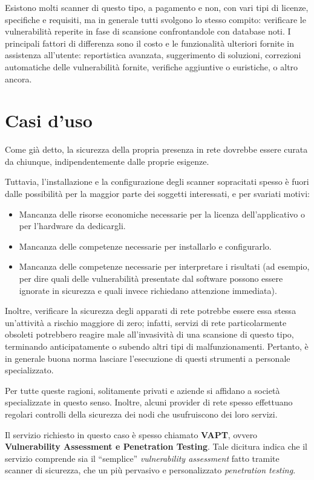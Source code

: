 Esistono molti scanner di questo tipo, a pagamento e non, con vari tipi di licenze, specifiche e requisiti, ma in generale tutti svolgono lo stesso compito: verificare le vulnerabilità reperite in fase di scansione confrontandole con database noti. I principali fattori di differenza sono il costo e le funzionalità ulteriori fornite in assistenza all'utente: reportistica avanzata, suggerimento di soluzioni, correzioni automatiche delle vulnerabilità fornite, verifiche aggiuntive o euristiche, o altro ancora.

\section{Casi d'uso}
Come già detto, la sicurezza della propria presenza in rete dovrebbe essere curata da chiunque, indipendentemente dalle proprie esigenze.

Tuttavia, l'installazione e la configurazione degli scanner sopracitati spesso è fuori dalle possibilità per la maggior parte dei soggetti interessati, e per svariati motivi:
\begin{itemize}
    \item Mancanza delle risorse economiche necessarie per la licenza dell'applicativo o per l'hardware da dedicargli.
    \item Mancanza delle competenze necessarie per installarlo e configurarlo.
    \item Mancanza delle competenze necessarie per interpretare i risultati (ad esempio, per dire quali delle vulnerabilità presentate dal software possono essere ignorate in sicurezza e quali invece richiedano attenzione immediata).
\end{itemize}

Inoltre, verificare la sicurezza degli apparati di rete potrebbe essere essa stessa un'attività a rischio maggiore di zero; infatti, servizi di rete particolarmente obsoleti potrebbero reagire male all'invasività di una scansione di questo tipo, terminando anticipatamente o subendo altri tipi di malfunzionamenti. Pertanto, è in generale buona norma lasciare l'esecuzione di questi strumenti a personale specializzato.

Per tutte queste ragioni, solitamente privati e aziende si affidano a società specializzate in questo senso. Inoltre, alcuni provider di rete spesso effettuano regolari controlli della sicurezza dei nodi che usufruiscono dei loro servizi.

Il servizio richiesto in questo caso è spesso chiamato \textbf{VAPT}, ovvero \textbf{Vulnerability Assessment e Penetration Testing}.
Tale dicitura indica che il servizio comprende sia il ``semplice'' \emph{vulnerability assessment} fatto tramite scanner di sicurezza, che un più pervasivo e personalizzato \emph{penetration testing}.

